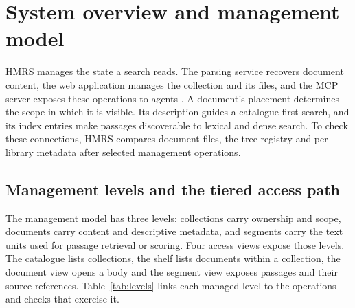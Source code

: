 \section{System overview and management model}
\label{sec:system}

HMRS manages the state a search reads. The parsing service recovers document
content, the web application manages the collection and its files, and the
MCP server exposes these operations to agents \cite{mcp}. A document's
placement determines the scope in which it is visible. Its description
guides a catalogue-first search, and its index entries make passages
discoverable to lexical and dense search. To check these connections, HMRS
compares document files, the tree registry and per-library metadata after
selected management operations.

\subsection{Management levels and the tiered access path}
\label{sec:levels}

The management model has three levels: collections carry ownership and scope,
documents carry content and descriptive metadata, and segments carry the
text units used for passage retrieval or scoring. Four access views expose
those levels. The catalogue lists collections, the shelf lists documents
within a collection, the document view opens a body and the segment view
exposes passages and their source references. Table~\ref{tab:levels} links each
managed level to the operations and checks that exercise it.

